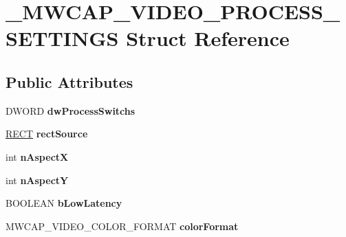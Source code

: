 \hypertarget{struct__MWCAP__VIDEO__PROCESS__SETTINGS}{\section{\-\_\-\-M\-W\-C\-A\-P\-\_\-\-V\-I\-D\-E\-O\-\_\-\-P\-R\-O\-C\-E\-S\-S\-\_\-\-S\-E\-T\-T\-I\-N\-G\-S Struct Reference}
\label{struct__MWCAP__VIDEO__PROCESS__SETTINGS}
}
\subsection*{Public Attributes}
\begin{DoxyCompactItemize}
\item 
\hypertarget{struct__MWCAP__VIDEO__PROCESS__SETTINGS_aaacd0981fe6be59369a0c90c0f605771}{D\-W\-O\-R\-D {\bfseries dw\-Process\-Switchs}}\label{struct__MWCAP__VIDEO__PROCESS__SETTINGS_aaacd0981fe6be59369a0c90c0f605771}

\item 
\hypertarget{struct__MWCAP__VIDEO__PROCESS__SETTINGS_aab2f2120e510dea9ca131c122e8e47b4}{\hyperlink{struct__RECT}{R\-E\-C\-T} {\bfseries rect\-Source}}\label{struct__MWCAP__VIDEO__PROCESS__SETTINGS_aab2f2120e510dea9ca131c122e8e47b4}

\item 
\hypertarget{struct__MWCAP__VIDEO__PROCESS__SETTINGS_a0246317619e1df6e2987073341cd2034}{int {\bfseries n\-Aspect\-X}}\label{struct__MWCAP__VIDEO__PROCESS__SETTINGS_a0246317619e1df6e2987073341cd2034}

\item 
\hypertarget{struct__MWCAP__VIDEO__PROCESS__SETTINGS_a5b77c87e820fbc1eaffb5531081c9676}{int {\bfseries n\-Aspect\-Y}}\label{struct__MWCAP__VIDEO__PROCESS__SETTINGS_a5b77c87e820fbc1eaffb5531081c9676}

\item 
\hypertarget{struct__MWCAP__VIDEO__PROCESS__SETTINGS_aebae4b29fccb7892ece1200edeaefead}{B\-O\-O\-L\-E\-A\-N {\bfseries b\-Low\-Latency}}\label{struct__MWCAP__VIDEO__PROCESS__SETTINGS_aebae4b29fccb7892ece1200edeaefead}

\item 
\hypertarget{struct__MWCAP__VIDEO__PROCESS__SETTINGS_a79219ac577bc1e27673b85997561311f}{M\-W\-C\-A\-P\-\_\-\-V\-I\-D\-E\-O\-\_\-\-C\-O\-L\-O\-R\-\_\-\-F\-O\-R\-M\-A\-T {\bfseries color\-Format}}\label{struct__MWCAP__VIDEO__PROCESS__SETTINGS_a79219ac577bc1e27673b85997561311f}


\end{DoxyCompactItemize}
